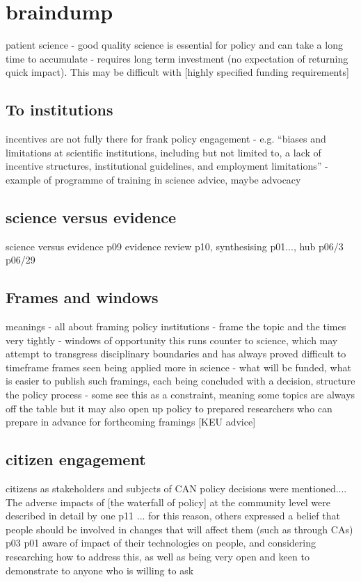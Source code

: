 \iffalse
\section{braindump}

patient science - good quality science is essential for policy and can take a long time to accumulate - requires long term investment (no expectation of returning quick impact). This may be difficult with [highly specified funding requirements]

\subsection{To institutions}
incentives are not fully there for frank policy engagement - e.g. \cite{ElsensohnACDGGKPRS2019} ``biases and limitations at scientific institutions, including but not limited to, a lack of incentive structures, institutional guidelines, and employment limitations'' - example of programme of training in science advice, maybe advocacy \cite{RussellWC2008}

\subsection{science versus evidence}
science versus evidence p09
evidence review p10, synthesising p01..., hub p06/3 p06/29

\subsection{Frames and windows}
meanings - all about framing
policy institutions - frame the topic and the times very tightly - windows of opportunity
this runs counter to science, which may attempt to transgress disciplinary boundaries and has always proved difficult to timeframe
frames seen being applied more in science - what will be funded, what is easier to publish
such framings, each being concluded with a decision, structure the policy process
- some see this as a constraint, meaning some topics are always off the table but it may also open up policy to prepared researchers who can prepare in advance for forthcoming framings [KEU advice]

\subsection{citizen engagement}
citizens as stakeholders and subjects of CAN policy decisions were mentioned.... The adverse impacts of [the waterfall of policy] at the community level were described in detail by one p11 ... for this reason, others expressed a belief that people should be involved in changes that will affect them (such as through CAs) p03  p01 aware of impact of their technologies on people, and considering researching how to address this, as well as being very open and keen to demonstrate to anyone who is willing to ask

